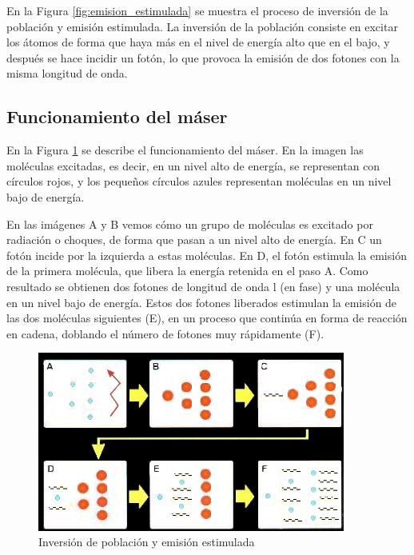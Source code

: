 \begin{itemize}
En la Figura \ref{fig:emision_estimulada} se muestra el proceso de inversi\'on de la poblaci\'on y emisi\'on estimulada. La inversi\'on de la poblaci\'on consiste en excitar los \'atomos de forma que haya m\'as en el nivel de energ\'ia alto que en el bajo, y despu\'es se hace incidir un fot\'on, lo que provoca la emisi\'on de dos fotones con la misma longitud de onda.

\end{itemize}

\subsection{Funcionamiento del m\'aser}

En la Figura \ref{fig:funcionamiento_maser} se describe el funcionamiento del m\'aser. En la imagen las mol\'eculas excitadas, es decir, en un nivel alto de energ\'ia, se representan con c\'irculos rojos, y los peque\~nos c\'irculos azules representan mol\'eculas en un nivel bajo de energ\'ia.

En las im\'agenes A y B vemos c\'omo un grupo de mol\'eculas es excitado por radiaci\'on o choques, de forma que pasan a un nivel alto de energ\'ia. En C un fot\'on incide por la izquierda a estas mol\'eculas. En D, el fot\'on estimula la emisi\'on de la primera mol\'ecula, que libera la energ\'ia retenida en el paso A. Como resultado se obtienen dos fotones de longitud de onda l (en fase) y una mol\'ecula en un nivel bajo de energ\'ia. Estos dos fotones liberados estimulan la emisi\'on de las dos mol\'eculas siguientes (E), en un proceso que contin\'ua en forma de reacci\'on en cadena, doblando el n\'umero de fotones muy r\'apidamente (F).

\begin{figure}[htb!!]
 \centering
 \includegraphics[width=0.9\textwidth]{./Utils/maser_funcionamiento2.png}
 \caption{Inversión de población y emisión estimulada}
 \label{fig:funcionamiento_maser}
\end{figure}

